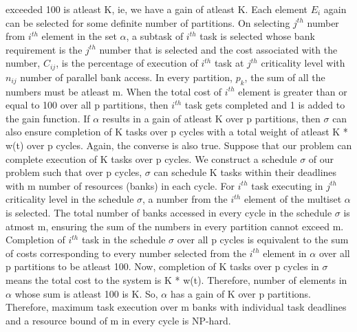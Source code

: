  exceeded 100 is atleast K, ie, we have a gain of atleast K. Each element $E_{i}$ again can be selected for some definite 
 number of partitions. 
 \newline
 \newline
 On selecting $j^{th}$ number from $i^{th}$ element in the set $\alpha$, a subtask of $i^{th}$ task is selected whose bank 
 requirement is the $j^{th}$ number that is selected and the cost associated with the number, $C_{ij}$, is the percentage of 
 execution of $i^{th}$ task at $j^{th}$ criticality level with $n_{ij}$ number of parallel bank access. In every partition, 
 $p_{k}$, the sum of all the numbers must be atleast m. When the total cost of $i^{th}$ element is greater than or equal to 100 
 over all p partitions, then $i^{th}$ task gets completed and 1 is added to the gain function. If $\alpha$ results in a gain of
 atleast K over p partitions, then $\sigma$ can also ensure completion of K tasks over p cycles with a total weight of atleast 
 K * w(t) over p cycles.
 \newline
 \newline
 Again, the converse is also true.
 \newline
 \newline
 Suppose that our problem can complete execution of K tasks over p cycles. We construct a schedule $\sigma$ of our 
 problem such that over p cycles, $\sigma$ can schedule K tasks within their deadlines with m number of resources (banks)
 in each cycle. For $i^{th}$ task executing in $j^{th}$ criticality level in the schedule $\sigma$, a number from the $i^{th}$ 
 element of the multiset $\alpha$ is selected. The total number of banks accessed in every cycle in the schedule $\sigma$ is 
 atmost m, ensuring the sum of the numbers in every partition cannot exceed m. Completion of $i^{th}$ task in the schedule 
 $\sigma$ over all p cycles is equivalent to the sum of costs corresponding to every number selected from the $i^{th}$ element 
 in $\alpha$ over all p partitions to be atleast 100. Now, completion of K tasks over p cycles in $\sigma$ means the 
 total cost to the system is K * w(t). Therefore, number of elements in $\alpha$ whose sum is atleast 100 is K. So, $\alpha$ 
 has a gain of K over p partitions.
 \newline
 \newline
 Therefore, maximum task execution over m banks with individual task deadlines and a resource bound of m in every cycle is
 NP-hard.

